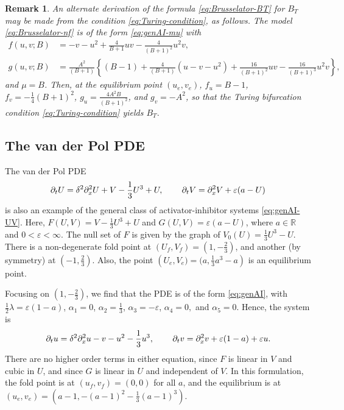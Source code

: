\documentclass[11pt]{article}
\def\eps{\varepsilon}
\numberwithin{equation}{section}
\newtheorem{remark}{Remark}[section]
\begin{document}
\begin{remark}
An alternate derivation of the formula \eqref{eq:Brusselator-BT} for $B_T$ may be made from the condition \eqref{eq:Turing-condition}, as follows. 
The model \eqref{eq:Brusselator-nf} is of the form \eqref{eq:genAI-mu} with
\begin{equation*}
\begin{split} 
f(u,v;B)&=-v - u^2 +\frac{4}{B+1}uv - \frac{4}{(B+1)^2}u^2v, \\
g(u,v;B)&=\frac{A^2}{(B+1)}
\left\{ 
(B-1) + \frac{4}{(B+1)}(u-v-u^2) + \frac{16}{(B+1)^2} uv - \frac{16}{(B+1)^3}u^2v
\right\},
\end{split}
\end{equation*}
and $\mu = B$. 
Then, at the equilibrium point $(u_e,v_e)$,
$f_u=B-1$,
$f_v=-\frac{1}{4}(B+1)^2$,
$g_u=\frac{4A^2B}{(B+1)^2}$,
and $g_v=-A^2$,
so that the Turing bifurcation condition \eqref{eq:Turing-condition} yields $B_T$.
\end{remark}



\subsection{The van der Pol PDE}
\label{ex:vanderPol}

The van der Pol PDE 
\begin{equation}\label{eq:vdPPDE}
        \partial_t U = \delta^2 \partial_x^2 U + V -\frac{1}{3} U^3 + U,
        \hskip0.3truein 
        \partial_t V = \partial_x^2 V + \eps(a-U)
\end{equation}
is also an example of the general class of activator-inhibitor systems \eqref{eq:genAI-UV}. 
Here, $F(U,V)= V - \frac{1}{3}U^3 + U$ and $G(U,V)=\varepsilon(a-U)$,
where $a \in \mathbb{R}$ and $0< \varepsilon < \infty$.
The null set of $F$ is given by the graph of $V_0(U)=\frac{1}{3}U^3 - U$.
There is a non-degenerate fold point at $(U_f,V_f)=\left(1,-\frac{2}{3}\right)$, and another (by symmetry) at $\left(-1,\frac{2}{3}\right)$.
Also, the point $\left(U_e,V_e)=(a,\frac{1}{3}a^3-a\right)$ is an equilibrium point.

Focusing on $(1, -\frac{2}{3})$, we find that the PDE is of the form \eqref{eq:genAI},
with $\frac{1}{2}\lambda = \varepsilon(1-a)$,
$\alpha_1=0$,
$\alpha_2=\frac{1}{3}$,
$\alpha_3=-\varepsilon$,
$\alpha_4=0,$
and $\alpha_5=0$.
Hence, the system is
\begin{equation}\label{eq:vdP-nf}
        \partial_t u = \delta^2 \partial_x^2 u -v -u^2 -\frac{1}{3}u^3, 
        \hskip0.3truein 
        \partial_t v = \partial_x^2 v +\eps(1-a) + \eps u.
\end{equation}
There are no higher order terms in either equation, since $F$ is linear in $V$ and cubic in $U$, and since $G$ is linear in $U$ and independent of $V$.
In this formulation, the fold point is at $(u_f,v_f)=(0,0)$ for all $a$, 
and the equilibrium is at $(u_e,v_e)=\left(a-1,-(a-1)^2 - \frac{1}{3}(a-1)^3\right)$.
\end{document}
